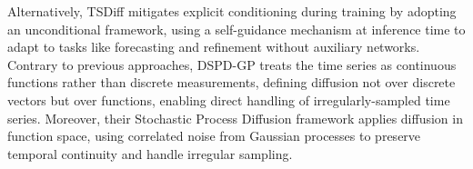 \documentclass[a4paper,oneside,bibliography=totoc]{scrbook}
\begin{document}
Alternatively, TSDiff \cite{kollovieh_predict_2023} mitigates explicit conditioning during training by adopting an unconditional framework, using a self-guidance mechanism at inference time to adapt to tasks like forecasting and refinement without auxiliary networks.
Contrary to previous approaches, DSPD-GP \cite{bilos_modeling_2023} treats the time series as continuous functions rather than discrete measurements, defining diffusion not over discrete vectors but over functions, enabling direct handling of irregularly-sampled time series.
Moreover, their Stochastic Process Diffusion framework applies diffusion in function space, using correlated noise from Gaussian processes to preserve temporal continuity and handle irregular sampling.
\end{document}
